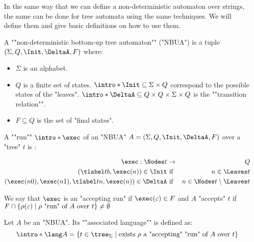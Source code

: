 \documentclass[a4paper,UKenglish,cleveref, autoref, thm-restate]{lipics-v2021}
\begin{document}
In the same way that we can define a non-deterministic automaton over strings, the same can be done for
tree automata using the same techniques. We will define them and give basic definitions on how to use them.

\begin{definition}
	\AP A ""non-deterministic bottom-up tree automaton"" (\reintro*"NBUA") is a tuple
	$(\Sigma, Q, \Init, \DeltaA, F)$ where:
	\begin{itemize}
		\item $\Sigma$ is an alphabet.
		\item $Q$ is a finite set of states.
		      \itemAP $\intro*\Init \subseteq \Sigma \times Q$ correspond to the possible states of the "leaves".
		      \itemAP $\intro*\DeltaA \subseteq Q \times Q \times \Sigma \times Q$ is the ""transition relation"".
		\item $F \subseteq Q$ is the set of "final states".
	\end{itemize}
\end{definition}

\begin{definition}
	\AP A ""run"" $\intro* \exec$ of an "NBUA" $A = (\Sigma, Q, \Init, \DeltaA, F)$ over a "tree" $t$ is :

	\begin{eqnarray*}
		\exec : \Nodes t  &\to& Q \\
		(\tlabel t b,  \exec (n) ) \in \Init &\text{ if }& n \in \Leaves t \\
		(\exec (n0), \exec (n1), \tlabel t n, \exec (n)) \in \DeltaA &\text{ if }& n \in \Nodes t \setminus \Leaves t
	\end{eqnarray*}

	We say that $\exec$ is an "accepting run" if $\exec (\varepsilon) \in F$ and $A$ "accepts" $t$ if
	$F \cap \left\{\rho(\varepsilon) \mid \text{$\rho$ "run" of~$A$ over~$t$}\right\} \neq \emptyset$
\end{definition}


\begin{definition}
	\AP Let $A$ be an "NBUA". Its ""associated language"" is defined as:
	\[\intro* \lang A = \setdef {t \in \tree_{\Sigma}} {\text{exists $\rho$ a "accepting" "run" of $A$ over $t$}} \]
\end{definition}
\end{document}
